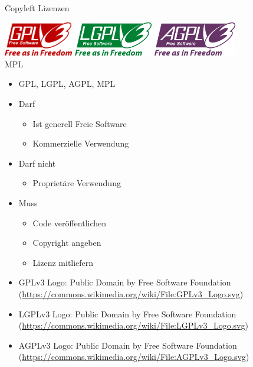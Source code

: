 \begin{frame}{Copyleft Lizenzen}
	\begin{center}
		\includegraphics[height=1.5cm]{res/gpl-v3-logo.pdf}
		\hfill
		\includegraphics[height=1.5cm]{res/lgpl-v3-logo.pdf}
		\hfill
		\includegraphics[height=1.5cm]{res/agpl-v3-logo.pdf}
		\\
		\vspace{1cm}
		{\Huge MPL}
	\end{center}
\end{frame}
\note
{
	\begin{itemize}
		\item GPL, LGPL, AGPL, MPL
		\item Darf
		\begin{itemize}
			\item Ist generell Freie Software
			\item Kommerzielle Verwendung
		\end{itemize}
		\item Darf nicht
		\begin{itemize}
			\item Proprietäre Verwendung
		\end{itemize}
		\item Muss
		\begin{itemize}
			\item Code veröffentlichen
			\item Copyright angeben
			\item Lizenz mitliefern
		\end{itemize}
	\end{itemize}
	\begin{itemize}
		\item GPLv3 Logo: Public Domain by Free Software Foundation (\url{https://commons.wikimedia.org/wiki/File:GPLv3\_Logo.svg})
		\item LGPLv3 Logo: Public Domain by Free Software Foundation (\url{https://commons.wikimedia.org/wiki/File:LGPLv3\_Logo.svg})
		\item AGPLv3 Logo: Public Domain by Free Software Foundation (\url{https://commons.wikimedia.org/wiki/File:AGPLv3\_Logo.svg})
	\end{itemize}
}


